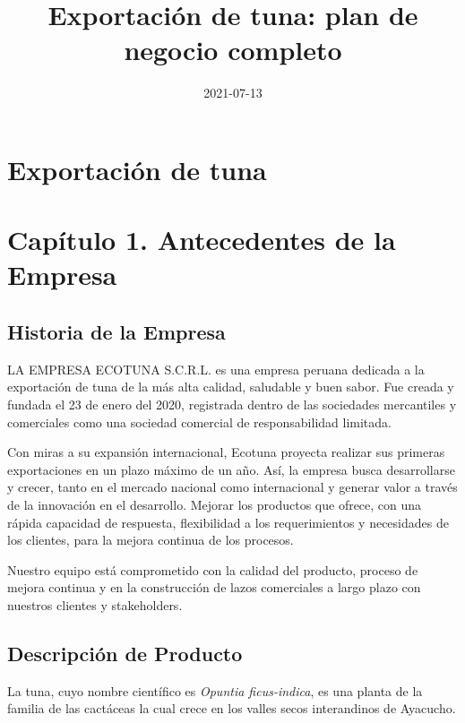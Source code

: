 \documentclass[
  stu,
  floatsintext,
  longtable,
  a4paper,
  nolmodern,
  notxfonts,
  notimes,
  12pt,
  colorlinks=true,linkcolor=blue,citecolor=blue,urlcolor=blue]{apa7}
\title{Exportación de tuna: plan de negocio completo}
\date{2021-07-13}
\begin{document}
\maketitle


\hypertarget{toc}{}
\tableofcontents
\newpage
\section[Introduction]{Exportación de tuna}

\setcounter{secnumdepth}{3}

\setlength\LTleft{0pt}




\section{Capítulo 1. Antecedentes de la
Empresa}\label{capuxedtulo-1.-antecedentes-de-la-empresa}

\subsection{Historia de la Empresa}\label{historia-de-la-empresa}

LA EMPRESA ECOTUNA S.C.R.L. es una empresa peruana dedicada a la
exportación de tuna de la más alta calidad, saludable y buen sabor. Fue
creada y fundada el 23 de enero del 2020, registrada dentro de las
sociedades mercantiles y comerciales como una sociedad comercial de
responsabilidad limitada.

Con miras a su expansión internacional, Ecotuna proyecta realizar sus
primeras exportaciones en un plazo máximo de un año. Así, la empresa
busca desarrollarse y crecer, tanto en el mercado nacional como
internacional y generar valor a través de la innovación en el
desarrollo. Mejorar los productos que ofrece, con una rápida capacidad
de respuesta, flexibilidad a los requerimientos y necesidades de los
clientes, para la mejora continua de los procesos.

Nuestro equipo está comprometido con la calidad del producto, proceso de
mejora continua y en la construcción de lazos comerciales a largo plazo
con nuestros clientes y stakeholders.

\subsection{Descripción de Producto}\label{descripciuxf3n-de-producto}

La tuna, cuyo nombre científico es \emph{Opuntia ficus-indica}, es una
planta de la familia de las cactáceas la cual crece en los valles secos
interandinos de Ayacucho.
\end{document}
